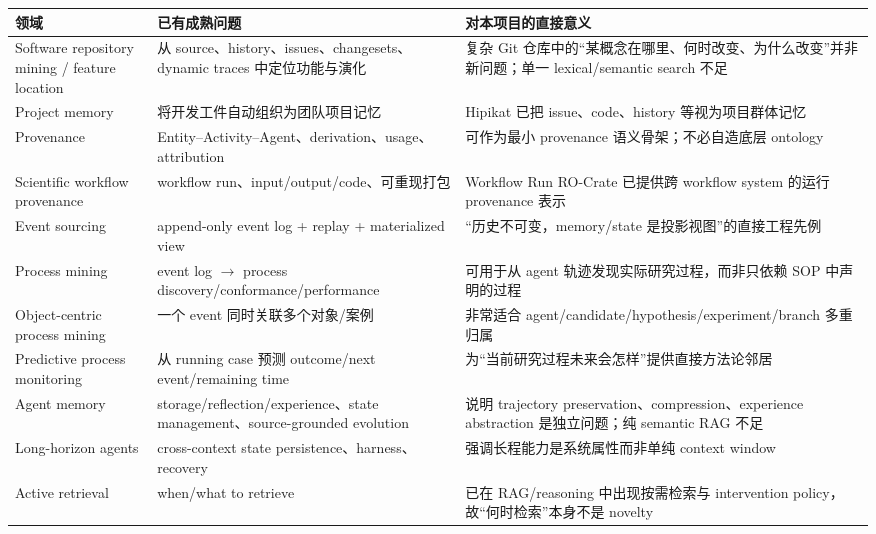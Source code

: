 \documentclass[11pt,a4paper]{ctexart}
\begin{document}
\begin{longtable}{p{}p{}p{}}
\toprule
领域 & 已有成熟问题 & 对本项目的直接意义\\
\midrule
Software repository mining / feature location & 从 source、history、issues、changesets、dynamic traces 中定位功能与演化 & 复杂 Git 仓库中的“某概念在哪里、何时改变、为什么改变”并非新问题；单一 lexical/semantic search 不足\parencite{dit2013feature,kagdi2007msr,chochlov2017historical}\\
Project memory & 将开发工件自动组织为团队项目记忆 & Hipikat 已把 issue、code、history 等视为项目群体记忆\parencite{cubranic2005hipikat}\\
Provenance & Entity--Activity--Agent、derivation、usage、attribution & 可作为最小 provenance 语义骨架；不必自造底层 ontology\parencite{w3cprov2013}\\
Scientific workflow provenance & workflow run、input/output/code、可重现打包 & Workflow Run RO-Crate 已提供跨 workflow system 的运行 provenance 表示\parencite{leo2024wfrun}\\
Event sourcing & append-only event log + replay + materialized view & “历史不可变，memory/state 是投影视图”的直接工程先例\parencite{fowler2005eventsourcing,santos2026esaa}\\
Process mining & event log $\to$ process discovery/conformance/performance & 可用于从 agent 轨迹发现实际研究过程，而非只依赖 SOP 中声明的过程\parencite{vanderAalst2016processmining,diba2021eventabstraction}\\
Object-centric process mining & 一个 event 同时关联多个对象/案例 & 非常适合 agent/candidate/hypothesis/experiment/branch 多重归属\parencite{berti2023ocpm,vanderAalst2026ocpm}\\
Predictive process monitoring & 从 running case 预测 outcome/next event/remaining time & 为“当前研究过程未来会怎样”提供直接方法论邻居\parencite{francescomarino2024ppm,verenich2019remaining}\\
Agent memory & storage/reflection/experience、state management、source-grounded evolution & 说明 trajectory preservation、compression、experience abstraction 是独立问题；纯 semantic RAG 不足\parencite{zhang2025memorysurvey,luo2026memorysurvey,chen2026mage,sun2026trajwiki}\\
Long-horizon agents & cross-context state persistence、harness、recovery & 强调长程能力是系统属性而非单纯 context window\parencite{dong2026longhorizon,wu2026reliable}\\
Active retrieval & when/what to retrieve & 已在 RAG/reasoning 中出现按需检索与 intervention policy，故“何时检索”本身不是 novelty\parencite{jiang2023flare,asai2024selfrag,guo2026realm,feng2026camdf}\\

\end{longtable}
\end{document}
